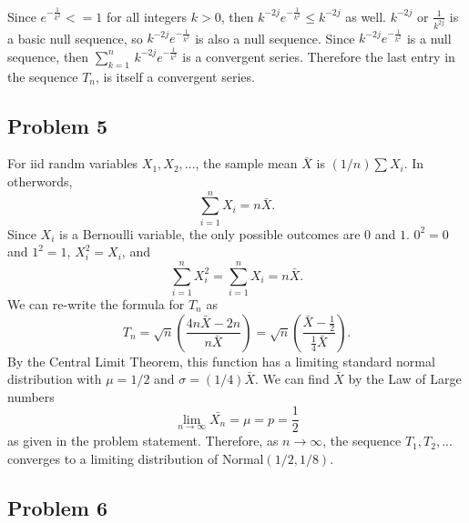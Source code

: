 \documentclass{article}
\begin{document}
Since $e^{-\frac{1}{k^2}} <= 1 $ for all integers $k > 0$, then $k^{-2j}e^{-\frac{1}{k^2}} \leq k^{-2j}$ as well. $k^{-2j}$ or $\frac{1}{k^{2j}}$ is a basic null sequence, so $k^{-2j}e^{-\frac{1}{k^2}}$ is also a null sequence. Since $k^{-2j}e^{-\frac{1}{k^2}}$ is a null sequence, then  $\sum_{k=1}^{n}\, k^{-2j}e^{-\frac{1}{k^2}}$ is a convergent series. Therefore the last entry in the sequence $T_n$, is itself a convergent series. 
\fi

\subsection*{Problem 5}
For iid randm variables $X_1, X_2, ...$, the sample mean $\bar{X}$ is $(1/n)\sum X_i$. In otherwords, 
\[\sum_{i=1}^{n}X_i = n\bar{X}.\]
Since $X_i$ is a Bernoulli variable, the only possible outcomes are $0$ and $1$. $0^2=0$ and $1^2=1$, $X_i^2 = X_i$, and \[\sum_{i=1}^n X_i^2 = \sum_{i=1}^n X_i = n\bar{X}.\] We can re-write the formula for $T_n$ as 
\[T_n = \sqrt{n}\left(\frac{4n\bar{X}-2n}{n\bar{X}}\right) = \sqrt{n}\left(\frac{\bar{X} - \frac{1}{2}}{\frac{1}{4}\bar{X}}\right).\]
By the Central Limit Theorem, this function has a limiting standard normal distribution with $\mu = 1/2$ and $\sigma = (1/4)\bar{X}$. We can find $\bar{X}$ by the Law of Large numbers
\[\lim_{n\to\infty}\bar{X_n} = \mu = p = \frac{1}{2}\] as given in the problem statement. Therefore, as $n\to\infty$, the sequence $T_1, T_2, ...$ converges to a limiting distribution of Normal$(1/2, 1/8)$. 

\iffalse
The sum of the distributions of multiple Bernoulli random variables is the binomial distribution. For Bernoulli random variables $X_i$ with mean $p = 1/2$, as $n$ goes to infinity, \[\sum_{i=1}^n X_i = nE(X_i) = n^2p = \frac{1}{2}n^2\] due to the Law of Large Numbers. Since $X_i$ is a Bernoulli variable, the only possible outcomes are $0$ and $1$. Since $0^2=0$ and $1^2=1$, $X_i^2 = X_i$, and \[\sum_{i=1}^n X_i^2 = \sum_{i=1}^n X_i = \frac{1}{2}n^2.\] Therefore, as $n\to\infty$, \[\lim_{n\to\infty}T_n = \lim_{n\to\infty}\sqrt{n}\left(\frac{4\sum_{i=1}^2 X_i - 2n}{\sum_{i=1}^n X_i^2}\right) =\lim_{n\to\infty} \sqrt{n}\left(\frac{2n^2-2n}{1/2n^2}\right) = \lim_{n\to\infty}4\left(\sqrt{n} - \frac{1}{\sqrt{n}}\right).\]
This limit goes to infinity. Therefore, as $n$ goes to infinity, the sequence  $T_1, T_2, ...$ does not converge. 
\fi

\subsection*{Problem 6}
\end{document}
